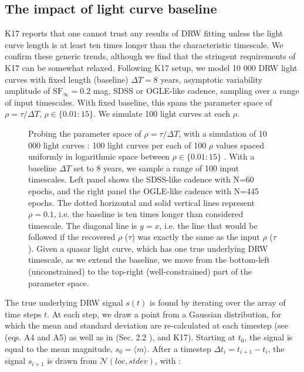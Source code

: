 \documentclass[twocolumn]{aastex62}
\begin{document}
\subsection{The impact of light curve baseline}\label{sec:baseline}

K17 reports that one cannot trust any results of DRW fitting unless the light curve length is at least ten times longer than the characteristic timescale. We confirm these generic trends, although we find that the stringent requirements of K17 can be somewhat relaxed. Following K17 setup,  we  model 10 000  DRW light curves with fixed length (baseline) $\Delta T=8$ years, asymptotic variability amplitude of  $\mathrm{SF}_{\infty} = 0.2$ mag, SDSS or OGLE-like cadence, sampling over a range of input timescales. With fixed baseline, this spans the parameter space of $\rho = \tau / \Delta T$, $\rho \in   \{ 0.01 : 15\}$. We simulate 100 light curves at each $\rho$. 

\begin{figure*}  %
\caption{Probing the parameter space of $\rho = \tau / \Delta T$, with a simulation of  10 000 light curves : 100 light curves per each of 100 $\rho$ values spaced uniformly in logarithmic space between $\rho \in   \{ 0.01 : 15\}$ . With a baseline $\Delta T$ set to 8 years,  we sample a range of 100 input timescales. Left panel shows the SDSS-like cadence with N=60 epochs, and the right panel the OGLE-like cadence with N=445 epochs. The dotted horizontal and solid vertical lines represent $\rho = 0.1$, i.e. the baseline is ten times longer than considered timescale. The diagonal line is $y=x$, i.e. the line that would be followed if the recovered  $\rho$ ($\tau$) was exactly the same as the input $\rho$ ($\tau$). Given a quasar light curve, which has one true underlying DRW timescale,  as we extend the baseline, we move from the bottom-left (unconstrained) to the top-right (well-constrained) part of the parameter space. } 
\label{fig:rho_space}
\end{figure*}


The true underlying DRW signal $s(t)$ is found by iterating over the array of time steps $t$.  At each step, we draw a point from a Gaussian distribution, for which the mean and standard deviation are re-calculated at each timestep (see \citealt{kelly2009} (eqs. A4 and A5) as well as in \cite{macleod2010} (Sec. 2.2 ), and K17). Starting at $t_{0}$, the signal is equal to the mean magnitude, $s_{0} = \langle m \rangle$. After a timestep $\Delta t_{i} = t_{i+1} - t_{i}$, the signal $s_{i+1}$ is drawn from  $\mathcal{N}(loc, stdev)$, with : 
\end{document}

